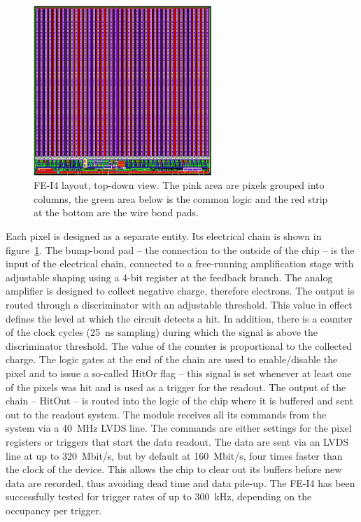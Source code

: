 \begin{figure}[!t]
\centering
\includegraphics[width=0.6\textwidth]{04_charge_monitoring/pics/fei41}
\caption{FE-I4 layout, top-down view. The pink area are pixels grouped into columns, the green area below is the common logic and the red strip at the bottom are the wire bond pads.}
\label{fig:anapix}
\end{figure}

Each pixel is designed as a separate entity. Its electrical chain is shown in figure~\ref{fig:anapix}. The bump-bond pad -- the connection to the outside of the chip -- is the input of the electrical chain, connected to a free-running amplification stage with adjustable shaping using a 4-bit register at the feedback branch. The analog amplifier is designed to collect negative charge, therefore electrons. The output is routed through a discriminator with an adjustable threshold. This value in effect defines the level at which the circuit detects a hit. In addition, there is a counter of the clock cycles (25~ns sampling) during which the signal is above the discriminator threshold. The value of the counter is proportional to the collected charge. The logic gates at the end of the chain are used to enable/disable the pixel and to issue a so-called HitOr flag -- this signal is set whenever at least one of the pixels was hit and is used as a trigger for the readout. The output of the chain -- HitOut -- is routed into the logic of the chip where it is buffered and sent out to the readout system. The module receives all its commands from the system via a 40~MHz LVDS line. The commands are either settings for the pixel registers or triggers that start the data readout. The data are sent via an LVDS line at up to 320~Mbit/s, but by default at 160~Mbit/s, four times faster than the clock of the device. This allows the chip to clear out its buffers before new data are recorded, thus avoiding dead time and data pile-up. The FE-I4 has been successfully tested for trigger rates of up to 300~kHz, depending on the occupancy per trigger. 

